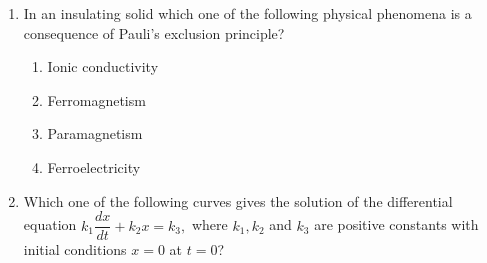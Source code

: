 \documentclass[14pt, a4paper]{extarticle}
\begin{document}
\begin{enumerate}[label=\textbf{Q. \arabic*}]
\item In an insulating solid which one of the following physical phenomena is a consequence of Pauli's exclusion principle?
    \begin{enumerate}[label=(\Alph*)]
        \item Ionic conductivity
        \item Ferromagnetism
        \item Paramagnetism
        \item Ferroelectricity
    \end{enumerate}

\item Which one of the following curves gives the solution of the differential equation
$ k_1\dfrac{dx}{dt} + k_2x = k_3, $
where $k_1, k_2$ and $k_3$ are positive constants with initial conditions $x=0$ at $t=0$?
\begin{enumerate}[label=(\Alph*)]
\end{enumerate}
\end{enumerate}
\end{document}
